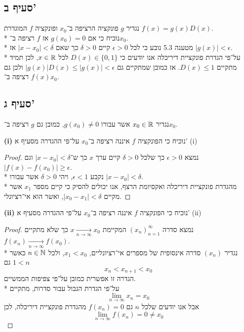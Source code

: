 \subsection{סעיף ב'}
נגדיר $g$ פונקציה הרציפה ב־$x_0$ ופונקציה $f$ המוגדרת $f(x) = g(x) D(x)$. \\*
נוכיח כי אם $g(x_0) = 0$ אז $f$ רציפה ב־$x_0$. \\*
מטענה 5.3 נובע כי לכל $\epsilon > 0$ קיים $\delta > 0$ כך שאם $|x - x_0| < \delta$ אז $|g(x)| < \epsilon$. \\*
על־פי הגדרת פונקציית דיריכלה אנו יודעים כי $D(x) \in \{0, 1\}$ לכל $x \in \mathbb{R}$,
לכן תמיד מתקיים $D(x) \le 1$. אז כמובן שמתקיים גם $|g(x)| D(x) \le |g(x)| < \epsilon$ ולכן גם $f(x)$ רציפה ב־$x_0$.

\subsection{סעיף ג'}
נגדיר $x_0 \in \mathbb{R}$ אשר עבורו $g(x_0) \ne 0$, כמובן גם $g$ רציפה ב־$x_0$.

\textbf{(i)}
נוכיח כי הפונקציה $f$ איננה רציפה ב־$x_0$ על־פי ההגדרה מסעיף א' (i)
\begin{proof}
	נמצא $\epsilon > 0$ כך שלכל $\delta > 0$ קיים ערך $x$ כך ש־$|x - x_0| < \delta$ וגם $|f(x) - f(x_0)| \ge \epsilon$. \\*
	נקבע $\epsilon < 1$, ויהי $\delta > 0$ אשר עבורו $|x - x_0| < \delta$. \\*
	מהגדרת פונקציית דיריכלה ואקסיומת הרצף, אנו יכולים להסיק כי קיים מספר $x_1$ אשר מקיים $|x_0 - x_1| < \delta$, ואשר הוא אי־רציונלי.
\end{proof}

\textbf{(ii)}
נוכיח כי הפונקציה $f$ איננה רציפה ב־$x_0$ על־פי ההגדרה מסעיף א' (ii)
\begin{proof}
	נמצא סדרה ${(x_n)}_{n = 1}^\infty$ המקיימת $x \underset{n \to \infty}{\rightarrow} x_0$ כך שלא מתקיים $f(x_n) \underset{n \to \infty}{\rightarrow} f(x_0)$. \\*
	נגדיר $(x_n)$ סדרה אינסופית של מספרים אי־רציונליים, $x_1 < x_0$, ולכל $n \in \mathbb{N}$ כאשר $1 < n$ גם
	\[
		x_n < x_{n + 1} < x_0
	\]
	הגדרה זו אפשרית כמובן על־פי צפיפות הממשיים. \\*
	על־פי הגדרת הגבול עבור סדרות, מתקיים
	\[
		\lim_{n \to \infty} x_n = x_0
	\]
	אבל אנו יודעים שלכל $n$ גם $f(x_n) = 0$ מהגדרת פונקציית דיריכלה, לכן
	\[
		\lim_{n \to \infty} f(x_n) = 0 \ne x_0
	\]
\end{proof}


